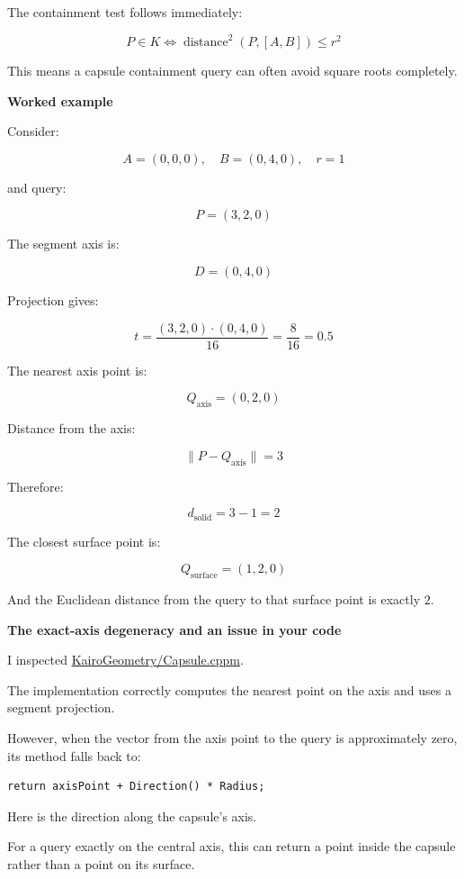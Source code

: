 The containment test follows immediately:

\[
\boxed{ P\in K \iff \operatorname{distance}^2(P,[A,B])\le r^2 }
\]

This means a capsule containment query can often avoid square roots completely.

\textbf{Worked example}

Consider:

\[
A=(0,0,0),\quad B=(0,4,0),\quad r=1
\]

and query:

\[
P=(3,2,0)
\]

The segment axis is:

\[
D=(0,4,0)
\]

Projection gives:

\[
t=\frac{(3,2,0)\cdot(0,4,0)}{16} =\frac{8}{16}=0.5
\]

The nearest axis point is:

\[
Q_{\mathrm{axis}}=(0,2,0)
\]

Distance from the axis:

\[
\|P-Q_{\mathrm{axis}}\|=3
\]

Therefore:

\[
d_{\mathrm{solid}}=3-1=2
\]

The closest surface point is:

\[
\boxed{Q_{\mathrm{surface}}=(1,2,0)}
\]

And the Euclidean distance from the query to that surface point is exactly \(2\).

\textbf{The exact-axis degeneracy and an issue in your code}

I inspected \href{https://github.com/swayam8624/KairoGeometry/blob/master/Capsule.cppm?utm_source=chatgpt.com}{KairoGeometry/Capsule.cppm}.

The implementation correctly computes the nearest point on the axis and uses a segment projection.

However, when the vector from the axis point to the query is approximately zero, its  method falls back to:

\begin{verbatim}
return axisPoint + Direction() * Radius;
\end{verbatim}

Here  is the direction along the capsule's axis.

For a query exactly on the central axis, this can return a point inside the capsule rather than a point on its surface.

